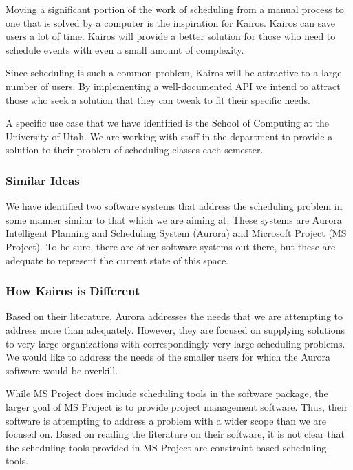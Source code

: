 \documentclass{extarticle}
\begin{document}
Moving a significant portion of the work of scheduling from a manual process to one that is solved by a computer is
the inspiration for Kairos.  Kairos can save users a lot of time.  Kairos will provide a better solution for those
who need to schedule events with even a small amount of complexity.

Since scheduling is such a common problem, Kairos will be attractive to a large number of users.  By implementing a
well-documented API we intend to attract those who seek a solution that they can tweak to fit their specific needs.

A specific use case that we have identified is the School of Computing at the University of Utah.  We are working
with staff in the department to provide a solution to their problem of scheduling classes each semester.

\subsubsection{Similar Ideas}
We have identified two software systems that address the scheduling problem in some manner similar to that which
we are aiming at.  These systems are Aurora Intelligent Planning and Scheduling System (Aurora) and Microsoft
Project (MS Project).  To be sure, there are other software systems out there, but these are adequate to represent
the current state of this space.

\subsubsection{How Kairos is Different}
Based on their literature, Aurora addresses the needs that we are attempting to address more than adequately.
However, they are focused on supplying solutions to very large organizations with correspondingly very large
scheduling problems.  We would like to address the needs of the smaller users for which the Aurora software would
be overkill.

While MS Project does include scheduling tools in the software package, the larger goal of MS Project is to provide
project management software.  Thus, their software is attempting to address a problem with a wider scope than we
are focused on.  Based on reading the literature on their software, it is not clear that the scheduling tools
provided in MS Project are constraint-based scheduling tools.
\end{document}
